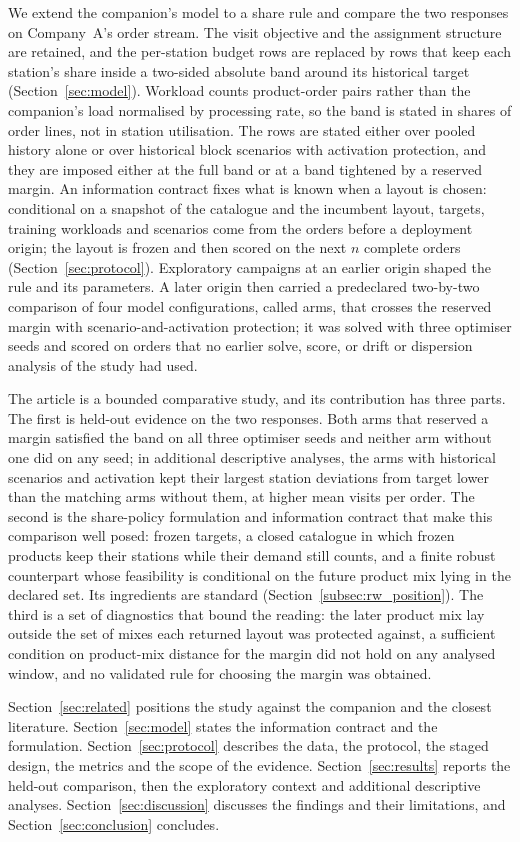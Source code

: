 We extend the companion's model to a share rule and compare the two responses on Company~A's order stream. The visit objective and the assignment structure are retained, and the per-station budget rows are replaced by rows that keep each station's share inside a two-sided absolute band around its historical target (Section~\ref{sec:model}). Workload counts product-order pairs rather than the companion's load normalised by processing rate, so the band is stated in shares of order lines, not in station utilisation. The rows are stated either over pooled history alone or over historical block scenarios with activation protection, and they are imposed either at the full band or at a band tightened by a reserved margin. An information contract fixes what is known when a layout is chosen: conditional on a snapshot of the catalogue and the incumbent layout, targets, training workloads and scenarios come from the orders before a deployment origin; the layout is frozen and then scored on the next $n$ complete orders (Section~\ref{sec:protocol}). Exploratory campaigns at an earlier origin shaped the rule and its parameters. A later origin then carried a predeclared two-by-two comparison of four model configurations, called arms, that crosses the reserved margin with scenario-and-activation protection; it was solved with three optimiser seeds and scored on orders that no earlier solve, score, or drift or dispersion analysis of the study had used.

The article is a bounded comparative study, and its contribution has three parts. The first is held-out evidence on the two responses. Both arms that reserved a margin satisfied the band on all three optimiser seeds and neither arm without one did on any seed; in additional descriptive analyses, the arms with historical scenarios and activation kept their largest station deviations from target lower than the matching arms without them, at higher mean visits per order. The second is the share-policy formulation and information contract that make this comparison well posed: frozen targets, a closed catalogue in which frozen products keep their stations while their demand still counts, and a finite robust counterpart whose feasibility is conditional on the future product mix lying in the declared set. Its ingredients are standard (Section~\ref{subsec:rw_position}). The third is a set of diagnostics that bound the reading: the later product mix lay outside the set of mixes each returned layout was protected against, a sufficient condition on product-mix distance for the margin did not hold on any analysed window, and no validated rule for choosing the margin was obtained.

Section~\ref{sec:related} positions the study against the companion and the closest literature. Section~\ref{sec:model} states the information contract and the formulation. Section~\ref{sec:protocol} describes the data, the protocol, the staged design, the metrics and the scope of the evidence. Section~\ref{sec:results} reports the held-out comparison, then the exploratory context and additional descriptive analyses. Section~\ref{sec:discussion} discusses the findings and their limitations, and Section~\ref{sec:conclusion} concludes.
